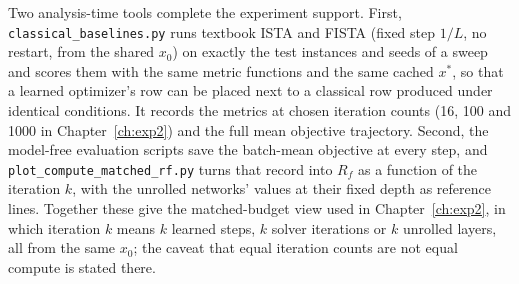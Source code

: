 Two analysis-time tools complete the experiment support. First,
\texttt{classical\_baselines.py} runs textbook ISTA and FISTA (fixed step
$1/L$, no restart, from the shared $x_0$) on exactly the test instances and
seeds of a sweep and scores them with the same metric functions and the same
cached $x^\ast$, so that a learned optimizer's row can be placed next to a
classical row produced under identical conditions. It records the metrics at
chosen iteration counts (16, 100 and 1000 in Chapter~\ref{ch:exp2}) and the
full mean objective trajectory. Second, the model-free evaluation scripts
save the batch-mean objective at every step, and
\texttt{plot\_compute\_matched\_rf.py} turns that record into
$R_f$ as a function of the iteration $k$, with the unrolled networks' values
at their fixed depth as reference lines. Together these give the
matched-budget view used in Chapter~\ref{ch:exp2}, in which iteration $k$
means $k$ learned steps, $k$ solver iterations or $k$ unrolled layers, all
from the same $x_0$; the caveat that equal iteration counts are not equal
compute is stated there.
